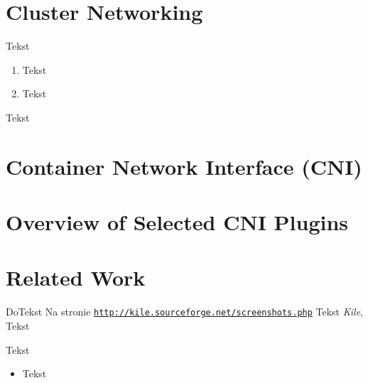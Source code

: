 \section{Cluster Networking}
\label{sec:k8s_networking}

Tekst
\begin{enumerate}%
\item Tekst

\item Tekst
\end{enumerate}
Tekst


\section{Container Network Interface (CNI)}
\label{sec:cni_intro}





\section{Overview of Selected CNI Plugins}
\label{sec:cni_overview}

\section{Related Work}
\label{sec:realted_work}


DoTekst
Na stronie \underline{\texttt{http://kile.sourceforge.net/screenshots.php}} Tekst {\em Kile}, Tekst

Tekst

\begin{itemize}
\item Tekst
\end{itemize}
